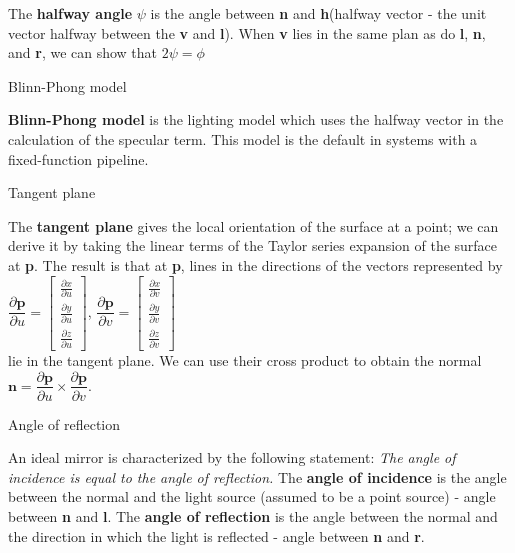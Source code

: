 \documentclass[10pt,a4paper]{article}
\begin{document}
\begin{enumerate}
			The \textbf{halfway angle} $ \psi $ is the angle between \textbf{n} and \textbf{h}(halfway vector - the unit vector halfway between the \textbf{v} and \textbf{l}). When \textbf{v} lies in the same plan as do \textbf{l}, \textbf{n}, and \textbf{r}, we can show that $ 2\psi = \phi $\\
			
		{\large \item Blinn-Phong model}
				
			\textbf{Blinn-Phong model} is the lighting model which uses the halfway vector in the calculation of the specular term. This model is the default in systems with a fixed-function pipeline.\\
			
		{\large \item Tangent plane}
				
			 The \textbf{tangent plane} gives the local orientation of the surface at a point; we can derive it by taking the linear terms of the Taylor series expansion of the surface at \textbf{p}. The result is that at \textbf{p}, lines in the directions of the vectors represented by \\ $ \dfrac{\partial \textbf{p}}{\partial u} = \begin{bmatrix} \frac{\partial x}{\partial u} \\ \frac{\partial y}{\partial u} \\ \frac{\partial z}{\partial u} \end{bmatrix} $, $ \dfrac{\partial \textbf{p}}{\partial v} = \begin{bmatrix} \frac{\partial x}{\partial v} \\ \frac{\partial y}{\partial v} \\ \frac{\partial z}{\partial v} \end{bmatrix} $ \\lie in the tangent plane. We can use their cross product to obtain the normal $ \textbf{n} = \dfrac{\partial \textbf{p}}{\partial u} \times \dfrac{\partial \textbf{p}}{\partial v} $.\\
			 
		{\large \item Angle of reflection}
				
			 An ideal mirror is characterized by the following statement: \textit{The angle of incidence is equal to the angle of reflection.} The \textbf{angle of incidence} is the angle between the normal and the light source (assumed to be a point source) - angle between \textbf{n} and \textbf{l}. The \textbf{angle of reflection} is the angle between the normal and the direction in which the light is reflected - angle between \textbf{n} and \textbf{r}.\\
			 

\end{enumerate}
\end{document}
